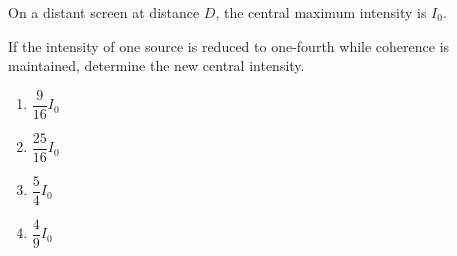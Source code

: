 \documentclass[12pt]{article}
\begin{document}
\begin{enumerate}[leftmargin=*]
On a distant screen at distance $D$, the central maximum intensity is $I_0$.  

If the intensity of one source is reduced to one-fourth while coherence is maintained, determine the new central intensity.

\begin{enumerate}
\item $\dfrac{9}{16}I_0$
\item $\dfrac{25}{16}I_0$
\item $\dfrac{5}{4}I_0$
\item $\dfrac{4}{9}I_0$
\end{enumerate}

\end{enumerate}
\end{document}

